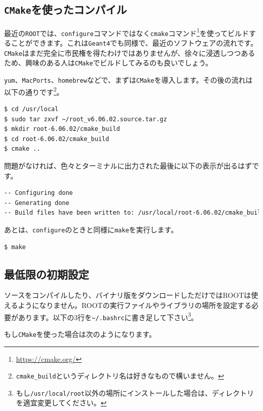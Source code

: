 \subsection{\texttt{CMake}を使ったコンパイル}
\label{subsec_compile_cmake}
最近の\texttt{ROOT}では、\texttt{configure}コマンドではなく\texttt{cmake}コマンド\footnote{\url{https://cmake.org/}}を使ってビルドすることができます。これは\texttt{Geant4}でも同様で、最近のソフトウェアの流れです。\texttt{CMake}はまだ完全に市民権を得たわけではありませんが、徐々に浸透しつつあるため、興味のある人は\texttt{CMake}でビルドしてみるのも良いでしょう。

\texttt{yum}、\texttt{MacPorts}、\texttt{homebrew}などで、まずは\texttt{CMake}を導入します。その後の流れは以下の通りです\footnote{\texttt{cmake\_build}というディレクトリ名は好きなもので構いません。}。

\begin{lstlisting}[language=bash]
$ cd /usr/local
$ sudo tar zxvf ~/root_v6.06.02.source.tar.gz
$ mkdir root-6.06.02/cmake_build
$ cd root-6.06.02/cmake_build
$ cmake ..
\end{lstlisting}

問題がなければ、色々とターミナルに出力された最後に以下の表示が出るはずです。
\begin{lstlisting}[language=bash]
-- Configuring done
-- Generating done
-- Build files have been written to: /usr/local/root-6.06.02/cmake_build
\end{lstlisting}

あとは、\texttt{configure}のときと同様に\texttt{make}を実行します。
\begin{lstlisting}[language=bash]
$ make
\end{lstlisting}

\subsection{最低限の初期設定}
\label{subsec_settings}
ソースをコンパイルしたり、バイナリ版をダウンロードしただけではROOTは使えるようになりません。ROOTの実行ファイルやライブラリの場所を設定する必要があります。以下の3行を\texttt{\~{}/.bashrc}に書き足して下さい\footnote{もし\texttt{/usr/local/root}以外の場所にインストールした場合は、ディレクトリを適宜変更してください。}。
\begin{NoFloat}

\end{NoFloat}
もし\texttt{CMake}を使った場合は次のようになります。
\begin{NoFloat}

\end{NoFloat}

